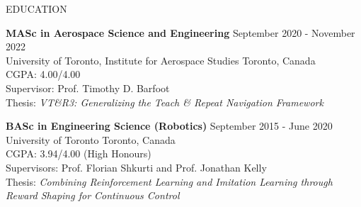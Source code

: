 \documentclass{cv}
\begin{document}

\begin{rSection}{EDUCATION}
  \item {\bf MASc in Aerospace Science and Engineering} \hfill {September 2020 - November 2022}\\
  University of Toronto, Institute for Aerospace Studies \hfill Toronto, Canada\\
  CGPA: 4.00/4.00\\
  Supervisor: Prof. Timothy D. Barfoot\\
  Thesis: \textit{VT\&R3: Generalizing the Teach \& Repeat Navigation Framework}

  \item {\bf BASc in Engineering Science (Robotics)} \hfill {September 2015 - June 2020}\\
  University of Toronto \hfill Toronto, Canada\\
  CGPA: 3.94/4.00 (High Honours)\\
  Supervisors: Prof. Florian Shkurti and Prof. Jonathan Kelly\\
  Thesis: \textit{Combining Reinforcement Learning and Imitation Learning through Reward Shaping for Continuous Control}
\end{rSection}
\end{document}
